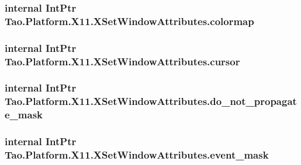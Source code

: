 \label{struct_tao_1_1_platform_1_1_x11_1_1_x_set_window_attributes_a7cd730ecfd85de45fa9ce8b7e3c6728e}
\hypertarget{struct_tao_1_1_platform_1_1_x11_1_1_x_set_window_attributes_a4cea078b5778b8b216022e25efc9587c}{
\subsubsection[{colormap}]{\setlength{\rightskip}{0pt plus 5cm}internal IntPtr {\bf Tao.Platform.X11.XSetWindowAttributes.colormap}}}
\label{struct_tao_1_1_platform_1_1_x11_1_1_x_set_window_attributes_a4cea078b5778b8b216022e25efc9587c}
\hypertarget{struct_tao_1_1_platform_1_1_x11_1_1_x_set_window_attributes_a641bfa0f6274c46a0893f2f4442d5e8d}{
\subsubsection[{cursor}]{\setlength{\rightskip}{0pt plus 5cm}internal IntPtr {\bf Tao.Platform.X11.XSetWindowAttributes.cursor}}}
\label{struct_tao_1_1_platform_1_1_x11_1_1_x_set_window_attributes_a641bfa0f6274c46a0893f2f4442d5e8d}
\hypertarget{struct_tao_1_1_platform_1_1_x11_1_1_x_set_window_attributes_ae681eb9c5a7ef436282cdf93da4953b1}{
\subsubsection[{do\_\-not\_\-propagate\_\-mask}]{\setlength{\rightskip}{0pt plus 5cm}internal IntPtr {\bf Tao.Platform.X11.XSetWindowAttributes.do\_\-not\_\-propagate\_\-mask}}}
\label{struct_tao_1_1_platform_1_1_x11_1_1_x_set_window_attributes_ae681eb9c5a7ef436282cdf93da4953b1}
\hypertarget{struct_tao_1_1_platform_1_1_x11_1_1_x_set_window_attributes_ae4d18535198ab2e7b4b5b8d2adcce479}{
\subsubsection[{event\_\-mask}]{\setlength{\rightskip}{0pt plus 5cm}internal IntPtr {\bf Tao.Platform.X11.XSetWindowAttributes.event\_\-mask}}}
